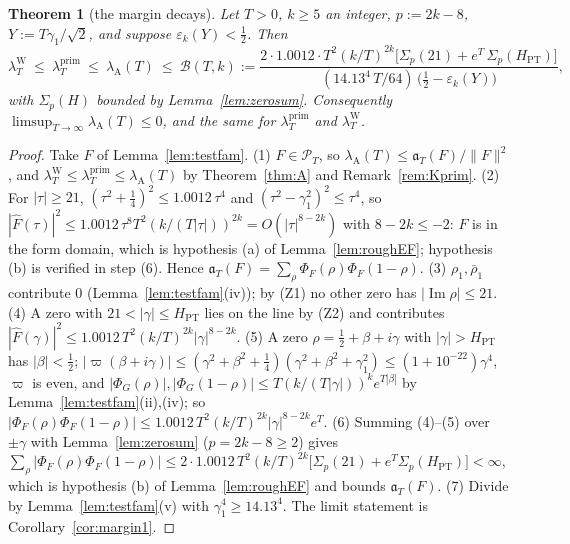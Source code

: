 \documentclass[10pt]{amsart}
\newtheorem{theorem}{Theorem}[section]
\theoremstyle{definition}
\theoremstyle{remark}
\newcommand{\Iml}{\operatorname{Im}}
\newcommand{\PT}{\mathcal P_T}
\newcommand{\lamP}{\lambda^{\mathrm{prim}}_T}
\newcommand{\lamW}{\lambda^{\mathrm W}_T}
\newcommand{\lamA}{\lambda_{\mathrm A}(T)}
\newcommand{\Fh}{\widehat F}
\begin{document}
\begin{theorem}[the margin decays]\label{thm:margin}
Let $T>0$, $k\ge5$ an integer, $p:=2k-8$, $Y:=T\gamma_1/\sqrt2$, and suppose $\varepsilon_k(Y)<\frac12$. Then
\begin{equation}\label{eq:Bmargin}
\lamW\ \le\ \lamP\ \le\ \lamA\ \le\ \mathcal B(T,k):=
\frac{2\cdot1.0012\cdot T^2(k/T)^{2k}\big[\Sigma_p(21)+e^T\,\Sigma_p(H_{\mathrm{PT}})\big]}
{(14.13^4\,T/64)\,\big(\frac12-\varepsilon_k(Y)\big)},
\end{equation}
with $\Sigma_p(H)$ bounded by Lemma~\ref{lem:zerosum}. Consequently $\limsup_{T\to\infty}\lamA\le0$, and the
same for $\lamP$ and $\lamW$.
\end{theorem}
\begin{proof}
Take $F$ of Lemma~\ref{lem:testfam}. (1) $F\in\PT$, so $\lamA\le\mathfrak a_T(F)/\|F\|^2$, and
$\lamW\le\lamP\le\lamA$ by Theorem~\ref{thm:A} and Remark~\ref{rem:Kprim}.
(2) For $|\tau|\ge21$, $(\tau^2+\frac14)^2\le1.0012\,\tau^4$ and $(\tau^2-\gamma_1^2)^2\le\tau^4$, so
$|\Fh(\tau)|^2\le1.0012\,\tau^8T^2(k/(T|\tau|))^{2k}=O(|\tau|^{8-2k})$ with $8-2k\le-2$: $F$ is in the
form domain, which is hypothesis (a) of Lemma~\ref{lem:roughEF}; hypothesis (b) is verified in step (6).
Hence $\mathfrak a_T(F)=\sum_\rho\Phi_F(\rho)\Phi_F(1-\rho)$.
(3) $\rho_1,\bar\rho_1$ contribute $0$ (Lemma~\ref{lem:testfam}(iv)); by (Z1) no other zero has $|\Iml\rho|\le21$.
(4) A zero with $21<|\gamma|\le H_{\mathrm{PT}}$ lies on the line by (Z2) and contributes
$|\Fh(\gamma)|^2\le1.0012\,T^2(k/T)^{2k}|\gamma|^{8-2k}$.
(5) A zero $\rho=\frac12+\beta+i\gamma$ with $|\gamma|>H_{\mathrm{PT}}$ has $|\beta|<\frac12$;
$|\varpi(\beta+i\gamma)|\le(\gamma^2+\beta^2+\frac14)(\gamma^2+\beta^2+\gamma_1^2)\le(1+10^{-22})\gamma^4$, $\varpi$ is even,
and $|\Phi_G(\rho)|,|\Phi_G(1-\rho)|\le T(k/(T|\gamma|))^ke^{T|\beta|}$ by Lemma~\ref{lem:testfam}(ii),(iv);
so $|\Phi_F(\rho)\Phi_F(1-\rho)|\le1.0012\,T^2(k/T)^{2k}|\gamma|^{8-2k}e^T$.
(6) Summing (4)--(5) over $\pm\gamma$ with Lemma~\ref{lem:zerosum} ($p=2k-8\ge2$) gives
$\sum_\rho|\Phi_F(\rho)\Phi_F(1-\rho)|\le2\cdot1.0012\,T^2(k/T)^{2k}\big[\Sigma_p(21)+e^T\Sigma_p(H_{\mathrm{PT}})\big]<\infty$,
which is hypothesis (b) of Lemma~\ref{lem:roughEF} and bounds $\mathfrak a_T(F)$.
(7) Divide by Lemma~\ref{lem:testfam}(v) with $\gamma_1^4\ge14.13^4$. The limit statement is
Corollary~\ref{cor:margin1}.
\end{proof}
\end{document}
